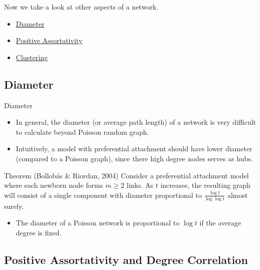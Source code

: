 \documentclass{beamer}
\begin{document}
\begin{frame}{}
	Now we take a look at other aspects of a network.
	\begin{itemize}
		\item \hyperlink{sec:diameter}{Diameter}
		\item \hyperlink{sec:assortativity}{Positive Assortativity}
		\item \hyperlink{sec:clustering}{Clustering}
	\end{itemize}
\end{frame}

\subsection{Diameter}\label{sec:diameter}

\begin{frame}{Diameter}
	\begin{itemize}
		\item
			In general, the diameter (or average path length) of a network is very difficult to calculate beyond Poisson random graph.
		\item
			Intuitively, a model with preferential attachment should have lower diameter (compared to a Poisson graph),
			since there high degree nodes serves as hubs.
	\end{itemize}
	\begin{block}{Theorem (Bollob\'{a}s \& Riordan, 2004)}
		Consider a preferential attachment model where each newborn node forms $m\geq 2$ links.
		As $t$ increases,
		the resulting graph will consist of a single component with diameter proportional to $\frac{\log{t}}{\log\log{t}}$ almost surely.
	\end{block}
	\begin{itemize}
		\item
			The diameter of a Poisson network is proportional to $\log{t}$ if the average degree is fixed.
	\end{itemize}
\end{frame}

\subsection{Positive Assortativity and Degree Correlation}\label{sec:assortativity}
\end{document}
